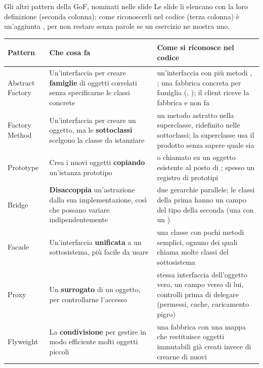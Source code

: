 \label{v:altri-gof}
\begin{guida}{{\badge[pcolore]{\thevoce}\enspace Gli altri pattern della GoF, nominati nelle slide}}
Le slide li elencano con la loro definizione (seconda colonna); come riconoscerli nel codice (terza colonna) è
un'aggiunta \oltre, per non restare senza parole se un esercizio ne mostra uno.

\smallskip
\renewcommand{\arraystretch}{1.3}
\begin{tabular}{@{}>{\bfseries\raggedright\arraybackslash}p{2.6cm} P{6.6cm} P{8.3cm}@{}}
  Pattern & \textbf{Che cosa fa} & \textbf{Come si riconosce nel codice} \\ \hline
  Abstract Factory & Un'interfaccia per creare \textbf{famiglie} di oggetti correlati senza specificarne le classi
    concrete & un'interfaccia con più metodi , ; una fabbrica concreta per famiglia
    (, ); il client riceve la fabbrica e non fa  \\
  Factory Method & Un'interfaccia per creare un oggetto, ma le \textbf{sottoclassi} scelgono la classe da istanziare &
    un metodo astratto  nella superclasse, ridefinito nelle sottoclassi; la superclasse usa il
    prodotto senza sapere quale sia \\
  Prototype & Crea i nuovi oggetti \textbf{copiando} un'istanza prototipo &  o  chiamato su
    un oggetto esistente al posto di ; spesso un registro di prototipi \\
  Bridge & \textbf{Disaccoppia} un'astrazione dalla sua implementazione, così che possano variare indipendentemente
    & due gerarchie parallele; le classi della prima hanno un campo del tipo della seconda (una  con un
    ) \\
  Facade & Un'interfaccia \textbf{unificata} a un sottosistema, più facile da usare & una classe con pochi metodi
    semplici, ognuno dei quali chiama molte classi del sottosistema \\
  Proxy & Un \textbf{surrogato} di un oggetto, per controllarne l'accesso & stessa interfaccia dell'oggetto vero, un
    campo verso di lui, controlli prima di delegare (permessi, cache, caricamento pigro) \\
  Flyweight & La \textbf{condivisione} per gestire in modo efficiente molti oggetti piccoli & una fabbrica con una
    mappa che restituisce oggetti immutabili già creati invece di crearne di nuovi \\

\end{tabular}
\end{guida}
